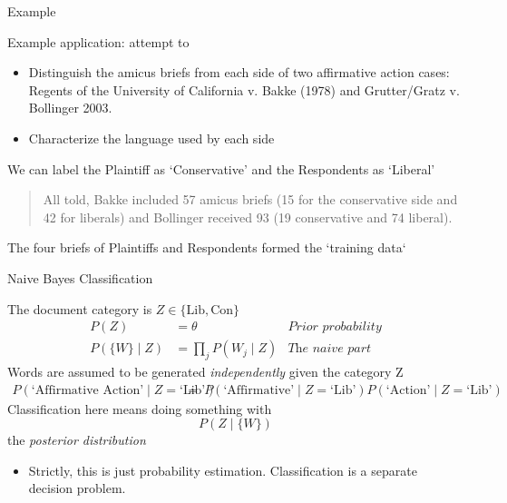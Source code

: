 \documentclass{hertieteaching}
\begin{document}
\begin{frame}{Example}

Example application: \textcite{Evans.etal2007} attempt to 
\begin{itemize}
  \item Distinguish the amicus briefs from each side of two  affirmative action cases: Regents of the University of California v. Bakke (1978) and Grutter/Gratz v. Bollinger 2003. 
  \item Characterize the language used by each side
\end{itemize}
We can label the Plaintiff as `Conservative' and the Respondents as `Liberal'

\medskip
\begin{quote}
All told, Bakke included 57 amicus briefs (15 for the conservative
side and 42 for liberals) and Bollinger received 93 (19
conservative and 74 liberal).\\
\hfill\parencite{Evans.etal2007}
\end{quote}

The four briefs of Plaintiffs and Respondents formed the `training data`

\end{frame}
\begin{frame}{Naive Bayes Classification}

The document category is $Z \in \{\text{Lib}, \text{Con}\}$ 
\begin{align*}
P(Z) & = \theta & \textit{Prior probability}\\
P(\{W\} \mid Z) & = \prod_j P(W_j \mid Z) & \textit{The naive part}
\end{align*}
Words are assumed to be generated 
\textit{independently} given the category Z
\begin{align*}
P( \text{`Affirmative Action'} \mid Z=\text{`Lib'}) &~=~ P( \text{`Affirmative'} \mid Z=\text{`Lib'}) 
 P( \text{`Action'} \mid Z=\text{`Lib'})
\end{align*}
\pause
Classification here means doing something with 
$$
P(Z \mid \{W\})
$$
the \textit{posterior distribution}
\begin{itemize}
  \item Strictly, this is just probability estimation.  Classification is a separate decision problem.
\end{itemize}


\end{frame}
\end{document}
